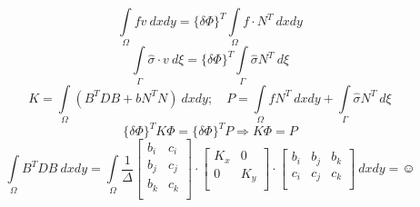 \documentclass{bmstu}
\begin{document}
	\[
	\int\limits_{\Omega}fv\ dxdy = \{\delta\Phi\}^T \int\limits_{\Omega}f \cdot N^T \ dx dy
	\]
	\[
	\int\limits_{\Gamma} \hat \sigma \cdot v\ d\xi = \{\delta \Phi\}^T \int\limits_{\Gamma} \hat \sigma N^T\ d\xi
	\]
	\[
	K = \int\limits_{\Omega}(B^T D B + b N^T N)\ dx dy;\quad P = \int\limits_{\Omega}fN^T\ dx dy + \int\limits_{\Gamma} \hat \sigma N^T\ d\xi
	\]
	\[
	\{\delta\Phi\}^T K \Phi = \{\delta\Phi\}^T P \Rightarrow K \Phi = P
	\]
	\[
		\int\limits_{\Omega} B^T D B \ dx dy = \int\limits_{\Omega} \frac{1}{\Delta} 
		\begin{bmatrix}
		b_i & c_i\\
		b_j & c_j\\
		b_k & c_k\\
		\end{bmatrix}
		\cdot
		\begin{bmatrix}
		K_x & 0\\
		0 & K_y\\
		\end{bmatrix}
		\cdot
		\begin{bmatrix}
		b_i & b_j & b_k\\
		c_i & c_j & c_k\\
		\end{bmatrix}
		\ dx dy = \smiley
	\]
	
\end{document}

